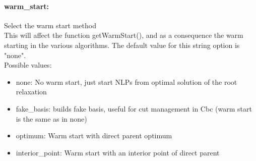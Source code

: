 \paragraph{warm\_start:}\label{sec:warm_start} Select the warm start method $\;$ \\
 This will affect the function getWarmStart(), and
as a consequence the warm starting in the various
algorithms.
The default value for this string option is "none".
\\ 
Possible values:
\begin{itemize}
   \item none: No warm start, just start NLPs from optimal
solution of the root relaxation
   \item fake\_basis: builds fake basis, useful for cut management in
Cbc (warm start is the same as in none)
   \item optimum: Warm start with direct parent optimum
   \item interior\_point: Warm start with an interior point of direct
parent
\end{itemize}

